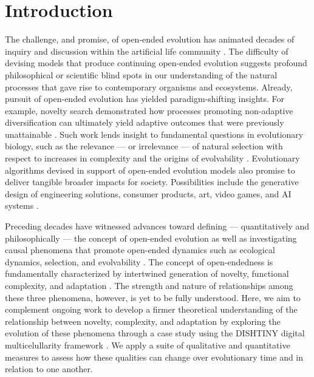 

\section{Introduction}

The challenge, and promise, of open-ended evolution has animated decades of inquiry and discussion within the artificial life community \citep{packard2019overview}.
The difficulty of devising models that produce continuing open-ended evolution suggests profound philosophical or scientific blind spots in our understanding of the natural processes that gave rise to contemporary organisms and ecosystems.
Already, pursuit of open-ended evolution has yielded paradigm-shifting insights.
For example, novelty search demonstrated how processes promoting non-adaptive diversification can ultimately yield adaptive outcomes that were previously unattainable \citep{lehman2011abandoning}.
Such work lends insight to fundamental questions in evolutionary biology, such as the relevance --- or irrelevance --- of natural selection with respect to increases in complexity \citep{lehman2012evolution, Lynch8597} and the origins of evolvability \citep{lehman2013evolvability,Kirschner8420}.
Evolutionary algorithms devised in support of open-ended evolution models also promise to deliver tangible broader impacts for society.
Possibilities include the generative design of engineering solutions, consumer products, art, video games, and AI systems \citep{nguyen2015,stanley2019open}.

Preceding decades have witnessed advances toward defining --- quantitatively and philosophically --- the concept of open-ended evolution \citep{lehman2012beyond,dolson2019modes,bedau1998classification} as well as investigating causal phenomena that promote open-ended dynamics such as ecological dynamics, selection, and evolvability \citep{dolson2019constructive,soros2014identifying,huizinga2018emergence}.
The concept of open-endedness is fundamentally characterized by intertwined generation of novelty, functional complexity, and adaptation \citep{taylor2016open}.
The strength and nature of relationships among these three phenomena, however, is yet to be fully understood.
Here, we aim to complement ongoing work to develop a firmer theoretical understanding of the relationship between novelty, complexity, and adaptation by exploring the evolution of these phenomena through a case study using the DISHTINY digital multicelullarity framework .
We apply a suite of qualitative and quantitative measures to assess how these qualities can change over evolutionary time and in relation to one another.
